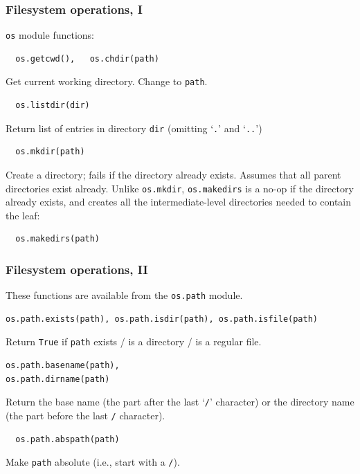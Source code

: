 \begin{frame}[fragile]\frametitle{Filesystem operations, I}
\texttt{os} module functions:

  \begin{lstlisting}
  os.getcwd(),   os.chdir(path)
  \end{lstlisting}
   Get current working directory. Change to \texttt{path}.
  \begin{lstlisting}
  os.listdir(dir)
  \end{lstlisting}
    Return list of entries in directory \texttt{dir} (omitting
    `\texttt{.}' and `\texttt{..}')
  \begin{lstlisting}
  os.mkdir(path)
  \end{lstlisting}
    Create a directory; fails if the directory already exists.
    Assumes that all parent directories exist already.
Unlike \lstinline|os.mkdir|, \lstinline|os.makedirs| is a no-op if the directory already exists,
and creates all the intermediate-level directories needed to contain the leaf:
  \begin{lstlisting}
  os.makedirs(path)
\end{lstlisting}
\end{frame}


\begin{frame}[fragile]\frametitle{Filesystem operations, II}
  These functions are available from the \texttt{os.path} module.

\begin{lstlisting}
os.path.exists(path), os.path.isdir(path), os.path.isfile(path)
\end{lstlisting}
    Return \texttt{True} if \texttt{path} exists / is a directory / is
    a regular file.
  \begin{lstlisting}
os.path.basename(path),
os.path.dirname(path)
  \end{lstlisting}
    Return the base name (the part after the last `\texttt{/}'
    character) or the directory name (the part before the last
    \texttt{/} character).
  \begin{lstlisting}
  os.path.abspath(path)
  \end{lstlisting}
    Make \texttt{path} absolute (i.e., start with a \texttt{/}).
\end{frame}

